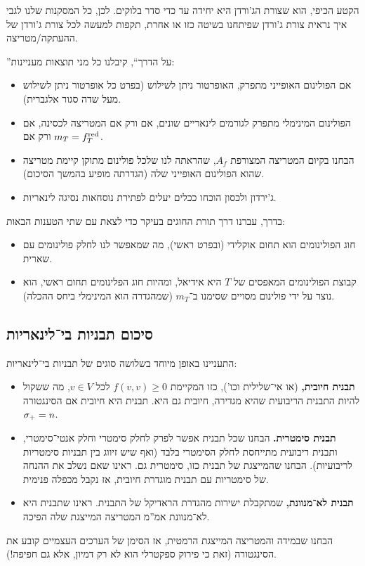\documentclass[name=רשימות אלגברה לינארית 2א]{../../../tex/classes/megasumPreamble}
\begin{document}
	הקטע הכיפי, הוא שצורת הג'ורדן היא יחידה עד כדי סדר בלוקים. לכן, כל המסקנות שלנו לגבי איך נראית צורת ג'ורדן שפיתחנו בשיטה כזו או אחרת, תקפות למעשה לכל צורת ג'ורדן של ההעתקה/מטריצה. 
	
	''על הדרך``, קיבלנו כל מני תוצאות מעניינות: 
	\begin{itemize}
		\item אם הפולינום האופייני מתפרק, האופרטור ניתן לשילוש (בפרט כל אופרטור ניתן לשילוש מעל שדה סגור אלגברית). 
		\item הפולינום המינימלי מתפרק לגורמים לינאריים שונים, אם ורק אם המטריצה לכסינה, אם ורק אם $m_T = f^{\mathrm{red}}_T$. 
		\item הבחנו בקיום המטריצה המצורפת $A_f$, שהראתה לנו שלכל פולינום מתוקן קיימת מטריצה שהוא הפולינום האופייני שלה (הגדרתה מופיע בהמשך הסיכום). 
		\item ג'ירדון ולכסון הוכחו ככלים יעלים לפתירת נוסחאות נסיגה לינאריות. 
	\end{itemize}
	בדרך, עברנו דרך תורת החוגים בעיקר כדי לצאת עם שתי הטענות הבאות: 
	\begin{itemize}
		\item חוג הפולינומים הוא תחום אוקלידי (ובפרט ראשי), מה שמאפשר לנו לחלק פולינומים עם שארית. 
		\item קבוצת הפולינומים המאפסים של $T$ היא אידיאל, ומהיות חוג הפלינומים תחום ראשי, הוא נוצר על ידי פולינום מסויים שסימנו ב־$m_T$ (שמהגדרה הוא המינימלי ביחס ההכלה). 
	\end{itemize}
	
	
	\subsection{סיכום תבניות בי־לינאריות}
	התעניינו באופן מיוחד בשלושה סוגים של תבניות בי־לינאריות: 
	\begin{itemize}
		\item \textbf{תבנית חיובית, }(או אי־שלילית וכו'), כזו המקיימת $f(v, v) \ge 0$ לכל $v \in V$, מה ששקול להיות התבנית הריבועית שהיא מגדירה, חיובית גם היא. תבנית היא חיובית אם הסינגטורה $\sigma_+ = n$. 
		\item \textbf{תבנית סימטרית. }הבחנו שכל תבנית אפשר לפרק לחלק סימטרי וחלק אנטי־סימטרי, ותבנית ריבועית מתייחסת לחלק הסימטרי בלבד (ואף שיש זיווג בין תבניות סימטריות לריבועיות). הבחנו שהמייצגת של תבנית כזו, סימטרית גם. ראינו שאם נשלב את ההנחה של סימטריות עם תבנית מוגדרת חיובית, אז נקבל מכפלה פנימית. 
		\item \textbf{תבנית לא־מנוונת, }שמתקבלת ישירות מהגדרת הראדיקל של התבנית. ראינו שתבנית היא לא־מנוונת אמ''מ המטריצה המייצגת שלה הפיכה. 
	\end{itemize}
	הבחנו שבמידה והמטריצה המייצגת הרמטית, אז הסימן של הערכים העצמיים קובע את הסינגטורה (זאת כי פירוק ספקטרלי הוא לא רק דמיון, אלא גם חפיפה!). 
	
\end{document}
